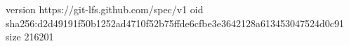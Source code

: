 version https://git-lfs.github.com/spec/v1
oid sha256:d2d49191f50b1252ad4710f52b75ffde6cfbe3e3642128a613453047524d0c91
size 216201
